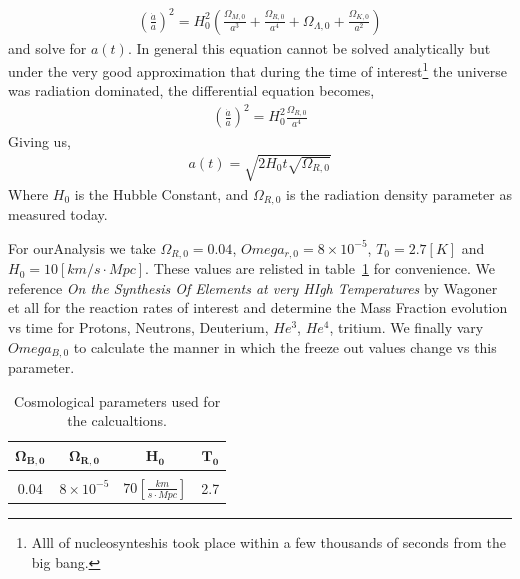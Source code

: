 \documentclass[twoside]{article}
\begin{document}
\begin{align}
\left(\frac{\dot{a}}{a}\right)^{2} = H_{0}^{2}\left(\frac{\Omega_{M,0}}{a^{3}} + \frac{\Omega_{R,0}}{a^{4}} + \Omega_{\Lambda,0} +\frac{\Omega_{K,0}}{a^{2}} \right)
 \end{align}
 and solve for $a(t)$. In general this equation cannot be solved analytically but  under the very good approximation that during the time of interest\footnote{Alll of nucleosynteshis took place within a few thousands of seconds from the big bang. } the universe was radiation dominated, the differential equation becomes,
\begin{align}
\left(\frac{\dot{a}}{a}\right)^{2} = H_{0}^{2}\frac{\Omega_{R,0}}{a^{4}} 
 \end{align}
 Giving us,
\begin{align}
a(t) = \sqrt{2H_{0}t\sqrt{\Omega_{R,0}}}\label{eq:aoft}
\end{align}
Where $H_{0}$ is the Hubble Constant, and $\Omega_{R,0}$ is  the radiation density parameter as measured today.

For ourAnalysis we take $\Omega_{R,0} = 0.04$, $Omega_{r,0} = 8\times 10^{-5}$, $T_{0} = 2.7 [K]$ and $H_{0} = 10 [km/s\cdot Mpc]$. These values are relisted in table~\ref{t:parameters} for convenience. We reference \emph{On the Synthesis Of Elements at very HIgh Temperatures} by Wagoner et all for the reaction rates of interest and determine the Mass Fraction evolution vs time for Protons, Neutrons, Deuterium, $He^{3}$, $He^{4}$, tritium. We finally  vary $Omega_{B,0}$ to calculate  the manner in which the freeze out values change vs this parameter.


\begin{table}[h!]
  \begin{center}
    \begin{tabular}{ c | c | c | c}
    $\boldsymbol{\Omega_{B,0}}$& $\boldsymbol{\Omega_{R,0}}$ & $\boldsymbol{H_{0}}$ & $\boldsymbol{T_{0}}$ \\\hline &&&\\
    0.04 & $8\times 10^{-5}$ & $70[\frac{km}{s\cdot Mpc}]$ &2.7
    \end{tabular}
  \end{center}
  \caption{Cosmological parameters used for the calcualtions.}\label{t:parameters}
\end{table}

\end{document}
